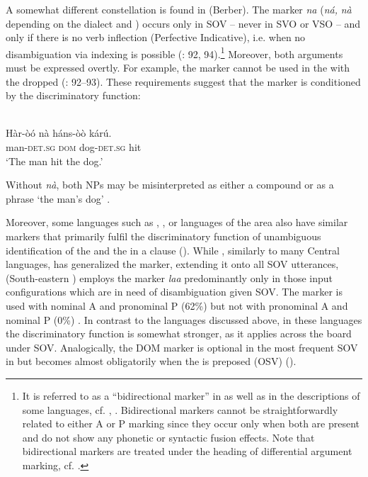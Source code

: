 \documentclass[output=paper]{langsci/langscibook}
\begin{document}
A somewhat different constellation is found in  (Berber). The marker \textit{na} (\textit{ná,} \textit{nà} depending on the dialect and ) occurs only in SOV  – never in SVO or VSO – and only if there is no verb inflection (Perfective Indicative), i.e. when no disambiguation via indexing is possible (\citealt{Heath2007}: 92, 94).\footnote{It is referred to as a “bidirectional  marker” in \citet{Heath2007} as well as in the descriptions of some  languages, cf. \citet{Diagana1995}, \citet{Nikitina2018}. Bidirectional  markers cannot be straightforwardly related to either A or P marking since they occur only when both are present and do not show any phonetic or syntactic fusion effects. Note that bidirectional  markers are treated under the heading of differential argument marking, cf. \citet{Nikitina2018}.} Moreover, both arguments must be expressed overtly. For example, the marker cannot be used in the  with the  dropped (\citealt{Heath2007}: 92–93). These requirements suggest that the marker is conditioned by the discriminatory function:

\ea 
{}\\
\gll Hàr-òó    nà  háns-òò  kárú.\\
     man-\textsc{det.sg}  \textsc{dom}  dog-\textsc{det.sg}  hit\\
\glt ‘The man hit the dog.’
\z

\noindent Without \textit{nà}, both NPs may be misinterpreted as either a compound or as a  phrase ‘the man’s dog’ \citep[91]{Heath2007}.

Moreover, some  languages such as , ,  or  languages of the area also have similar markers that primarily fulfil the discriminatory function of unambiguous identification of the  and the  in a clause (\citealt{Heath2007,CreisselsDiagne2013,Nikitina2018}). While , similarly to many Central  languages, has generalized the marker, extending it onto all SOV utterances,  (South-eastern ) employs the marker \textit{laa} predominantly only in those input configurations which are in need of disambiguation given SOV. The marker is used with nominal A and pronominal P (62\%) but not with pronominal A and nominal P (0\%) \citep[202]{Nikitina2018}. In contrast to the languages discussed above, in these languages the discriminatory function is somewhat stronger, as it applies across the board under SOV. Analogically, the DOM marker is optional in the most frequent SOV  in  but becomes almost obligatorily when the  is preposed (OSV) (\citealt{AhnCho2007}).
\end{document}
